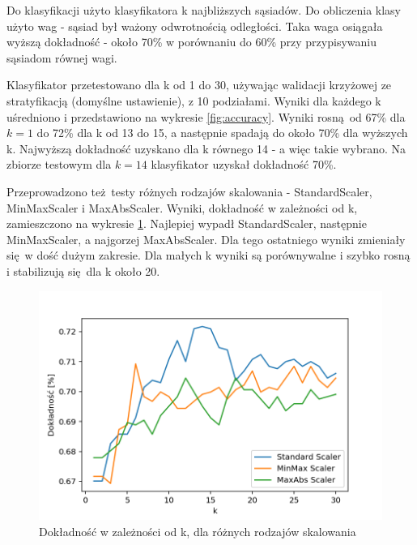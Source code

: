 \documentclass[12pt]{article}
\begin{document}
Do klasyfikacji użyto klasyfikatora k najbliższych sąsiadów. Do obliczenia klasy użyto wag - sąsiad był ważony odwrotnością odległości. Taka waga osiągała wyższą dokładność - około 70\% w porównaniu do 60\% przy przypisywaniu sąsiadom równej wagi.

Klasyfikator przetestowano dla k od 1 do 30, używając walidacji krzyżowej ze stratyfikacją (domyślne ustawienie), z 10 podziałami. Wyniki dla każdego k uśredniono i przedstawiono na wykresie \ref{fig:accuracy}. Wyniki rosną od 67\% dla $k=1$ do 72\% dla k od 13 do 15, a następnie spadają do około 70\% dla wyższych k. Najwyższą dokładność uzyskano dla k równego 14 - a więc takie wybrano. Na zbiorze testowym dla $k=14$ klasyfikator uzyskał dokładność 70\%.

Przeprowadzono też testy różnych rodzajów skalowania - StandardScaler, MinMaxScaler i MaxAbsScaler. Wyniki, dokładność w zależności od k, zamieszczono na wykresie \ref{fig:accuracy-scalers}. Najlepiej wypadł StandardScaler, następnie MinMaxScaler, a najgorzej MaxAbsScaler. Dla tego ostatniego wyniki zmieniały się w dość dużym zakresie. Dla małych k wyniki są porównywalne i szybko rosną i stabilizują się dla k około 20.

\begin{figure}[htb!]
	\centering
	\includegraphics[width=0.7\columnwidth]{accuracy_scalers.png}
	\caption{Dokładność w zależności od k, dla różnych rodzajów skalowania}
	\label{fig:accuracy-scalers}
\end{figure}
\end{document}
